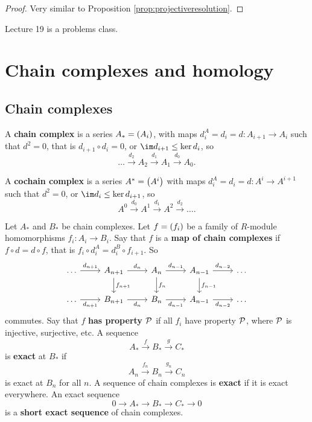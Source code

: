 \begin{proof}
Very similar to Proposition \ref{prop:projectiveresolution}.
\end{proof}


Lecture 19 is a problems class.

\pagebreak

\section{Chain complexes and homology}

\subsection{Chain complexes}


\begin{definition}
A \textbf{chain complex} is a series $ A_* = \br{A_i} $, with maps $ d_i^A = d_i = d : A_{i + 1} \to A_i $ such that $ d^2 = 0 $, that is $ d_{i + 1} \circ d_i = 0 $, or $ \im d_{i + 1} \le \ker d_i $, so
$$ \dots \xrightarrow{d_2} A_2 \xrightarrow{d_1} A_1 \xrightarrow{d_0} A_0. $$
\end{definition}

\begin{definition}
A \textbf{cochain complex} is a series $ A^* = \br{A^i} $ with maps $ d_i^A = d_i = d : A^i \to A^{i + 1} $ such that $ d^2 = 0 $, or $ \im d_i \le \ker d_{i + 1} $, so
$$ A^0 \xrightarrow{d_0} A^1 \xrightarrow{d_1} A^2 \xrightarrow{d_2} \dots. $$
\end{definition}

Let $ A_* $ and $ B_* $ be chain complexes. Let $ f = \br{f_i} $ be a family of $ R $-module homomorphisms $ f_i : A_i \to B_i $. Say that $ f $ is a \textbf{map of chain complexes} if $ f \circ d = d \circ f $, that is $ f_i \circ d_i^A = d_i^B \circ f_{i + 1} $. So
$$
\begin{tikzcd}
\dots \arrow{r}{d_{n + 1}} & A_{n + 1} \arrow{r}{d_n} \arrow{d}{f_{n + 1}} & A_n \arrow{r}{d_{n - 1}} \arrow{d}{f_n} & A_{n - 1} \arrow{r}{d_{n - 2}} \arrow{d}{f_{n - 1}} & \dots \\
\dots \arrow{r}[swap]{d_{n + 1}} & B_{n + 1} \arrow{r}[swap]{d_n} & B_n \arrow{r}[swap]{d_{n - 1}} & A_{n - 1} \arrow{r}[swap]{d_{n - 2}} & \dots
\end{tikzcd}
$$
commutes. Say that $ f $ \textbf{has property $ \mathcal{P} $} if all $ f_i $ have property $ \mathcal{P} $, where $ \mathcal{P} $ is injective, surjective, etc. A sequence
$$ A_* \xrightarrow{f} B_* \xrightarrow{g} C_* $$
is \textbf{exact} at $ B_* $ if
$$ A_n \xrightarrow{f_n} B_n \xrightarrow{g_n} C_n $$
is exact at $ B_n $ for all $ n $. A sequence of chain complexes is \textbf{exact} if it is exact everywhere. An exact sequence
$$ 0 \to A_* \to B_* \to C_* \to 0 $$
is a \textbf{short exact sequence} of chain complexes.


